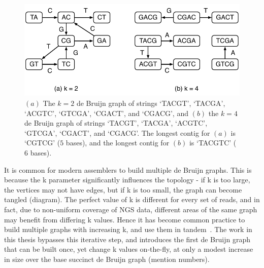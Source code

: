 \begin{figure}
	\begin{center}
		\includegraphics[scale=0.7]{images/altering-k.pdf}
		\caption{$(a)$ The $k=2$ de Bruijn graph of strings `TACGT', `TACGA', `ACGTC', `GTCGA', `CGACT', and
			`CGACG', and $(b)$ the $k=4$ de Bruijn graph of strings `TACGT', `TACGA', `ACGTC', `GTCGA', `CGACT', and
			`CGACG'. The longest contig for $(a)$ is `CGTCG' ($5$ bases), and the longest contig for $(b)$ is `TACGTC' ($6$ bases).}
		\label{figure:varying-k}
	\end{center}
\end{figure}

It is common for modern assemblers to build multiple de Bruijn graphs. This is because the k parameter significantly influences the topology - if k is too large, the vertices may not have edges, but if k is too small, the graph can become tangled (diagram). The perfect value of k is different for every set of reads, and in fact, due to non-uniform coverage of NGS data, different areas of the same graph may benefit from differing k values. Hence it has become common practice to build multiple graphs with increasing k, and use them in tandem~\cite{bankevich2012spades,peng2010idba}. The work in this thesis bypasses this iterative step, and introduces the first de Bruijn graph that can be built once, yet change k values on-the-fly, at only a modest increase in size over the base succinct de Bruijn graph (mention numbers).

